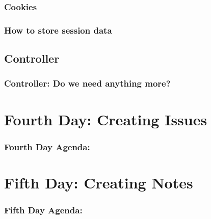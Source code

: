 \documentclass{beamer}
\theoremstyle{mystyle}
\begin{document}
    \subsubsection{Cookies}
      \begin{frame}
        \frametitle{How to store session data}
      \end{frame}
      \subsection{Controller}
      \begin{frame}
        \frametitle{Controller: Do we need anything more?}
      \end{frame}
 

\section{Fourth Day: Creating Issues}
    \begin{frame}
      \frametitle{Fourth Day Agenda:}
      \tableofcontents
      [
      currentsection,
      sectionstyle=hide/hide,
      subsectionstyle=show/show/hide
      ]
    \end{frame}

\section{Fifth Day: Creating Notes}
    \begin{frame}
      \frametitle{Fifth Day Agenda:}
      \tableofcontents
      [
      currentsection,
      sectionstyle=hide/hide,
      subsectionstyle=show/show/hide
      ]
    \end{frame}
  
\end{document}
